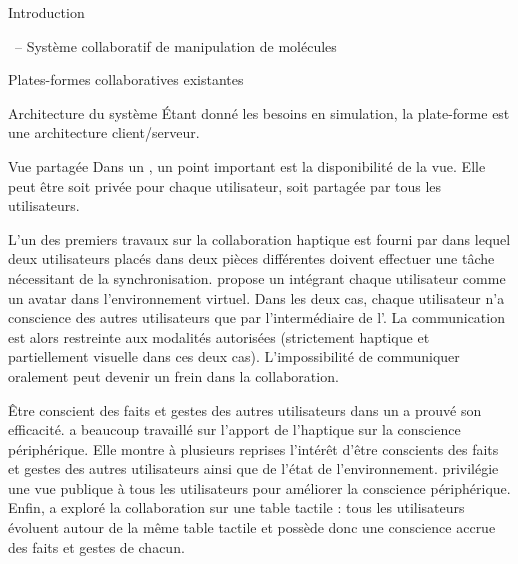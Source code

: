 \documentclass[myfrancais]{mythesis}
\begin{document}
\begin{mypart}{Introduction}
\begin{mychapter}{\myShaddock\ -- Système collaboratif de manipulation de molécules}
\begin{mysection}{Plates-formes collaboratives existantes}
\begin{mysubsection}{Architecture du système}
					Étant donné les besoins en simulation, la plate-forme \myShaddock est une architecture client/serveur.
				\end{mysubsection}
				\begin{mysubsection}{Vue partagée}
					Dans un , un point important est la disponibilité de la vue.
					Elle peut être soit privée pour chaque utilisateur, soit partagée par tous les utilisateurs.

					L'un des premiers travaux sur la collaboration haptique est fourni par  dans lequel deux utilisateurs placés dans deux pièces différentes doivent effectuer une tâche nécessitant de la synchronisation.
					 propose un  intégrant chaque utilisateur comme un avatar dans l'environnement virtuel.
					Dans les deux cas, chaque utilisateur n'a conscience des autres utilisateurs que par l'intermédiaire de l'.
					La communication est alors restreinte aux modalités autorisées (strictement haptique et partiellement visuelle dans ces deux cas).
					L'impossibilité de communiquer oralement peut devenir un frein dans la collaboration.

					Être conscient des faits et gestes des autres utilisateurs dans un  a prouvé son efficacité.
					 a beaucoup travaillé sur l'apport de l'haptique sur la conscience périphérique.
					Elle montre à plusieurs reprises l'intérêt d'être conscients des faits et gestes des autres utilisateurs ainsi que de l'état de l'environnement.
					 privilégie une vue publique à tous les utilisateurs pour améliorer la conscience périphérique.
					Enfin,  a exploré la collaboration sur une table tactile : tous les utilisateurs évoluent autour de la même table tactile et possède donc une conscience accrue des faits et gestes de chacun.


\end{mysubsection}
\end{mysection}
\end{mychapter}
\end{mypart}
\end{document}
